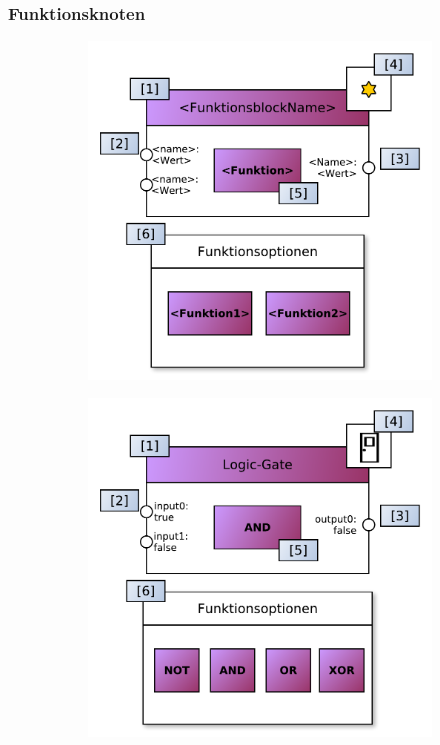 
\subsubsection{Funktionsknoten}
\begin{figure}[h]
\centering
\begin{subfigure}{.5\textwidth}
  \centering
  \includegraphics[width=1\linewidth]{bilder/chapter4/chapter4_3/genericfunctionnode.pdf}
  \caption{}
  \label{fig:functionnodesgen}
\end{subfigure}%
\begin{subfigure}{.5\textwidth}
  \centering
  \includegraphics[width=1\linewidth]{bilder/chapter4/chapter4_3/instancegatefunctionnode.pdf}

\end{subfigure}
\end{figure}
